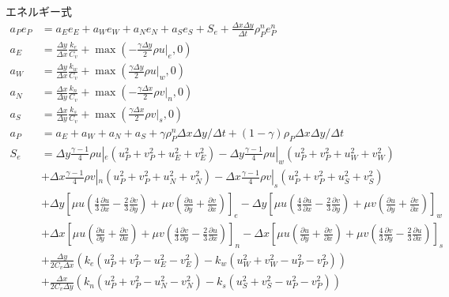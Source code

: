 \documentclass[a4paper,10pt,fleqn,dvipdfmx]{jsarticle}
\begin{document}
エネルギー式
\begin{align}
   a_Pe_P&=a_E e_E + a_W e_W + a_N e_N+a_S e_S +S_e +\frac{\Delta x\Delta
 y}{\Delta t}\rho_P^n e_P^n \\
a_E &= \frac{\Delta y}{\Delta x}\frac{k_e}{C_v} + \max(-\frac{\gamma\Delta
 y}{2} \rho u|_e, 0)\\
a_W &=  \frac{\Delta y}{\Delta x}\frac{k_w}{C_v} + \max(\frac{\gamma\Delta
 y}{2} \rho u|_w, 0)\\
 a_N &= \frac{\Delta x}{\Delta y}\frac{k_n}{C_v} + \max(-\frac{\gamma\Delta
 x}{2} \rho v|_n, 0)\\
 a_S &= \frac{\Delta x}{\Delta y}\frac{k_s}{C_v} + \max(\frac{\gamma\Delta
 x}{2} \rho v|_s, 0) \\
a_P &= a_E +a_W + a_N + a_S + \gamma\rho_P^n \Delta x \Delta y/\Delta t
 +(1-\gamma)\rho_P \Delta x \Delta y/\Delta t\\
S_e &= \Delta y \frac{\gamma-1}{4}\rho u|_e(u_P^2+v_P^2 + u_E^2+v_E^2)
- \Delta y \frac{\gamma-1}{4}\rho u|_w(u_P^2+v_P^2 + u_W^2+v_W^2)
\nonumber \\
& + \Delta x \frac{\gamma-1}{4}\rho v|_n(u_P^2+v_P^2 + u_N^2+v_N^2)
 - \Delta x \frac{\gamma-1}{4}\rho v|_s(u_P^2+v_P^2 + u_S^2+v_S^2)
\nonumber \\
& + \Delta y\left[\mu u \left(\frac{4}{3}\frac{\partial u}{\partial x} -
 \frac{2}{3}\frac{\partial v}{\partial y}\right) + \mu v\left( \frac{\partial u}{\partial y} +
 \frac{\partial v}{\partial x}\right)\right]_e
- \Delta y\left[\mu u \left(\frac{4}{3}\frac{\partial u}{\partial x} -
 \frac{2}{3}\frac{\partial v}{\partial y}\right) + \mu v\left( \frac{\partial u}{\partial y} +
 \frac{\partial v}{\partial x}\right)\right]_w
\nonumber \\
&+ \Delta x\left[\mu u \left(\frac{\partial u}{\partial y} +
 \frac{\partial v}{\partial x}\right) +  \mu v\left(\frac{4}{3}\frac{\partial v}{\partial y} -
 \frac{2}{3}\frac{\partial u}{\partial x}\right)\right]_n
-  \Delta x\left[\mu u \left(\frac{\partial u}{\partial y} +
 \frac{\partial v}{\partial x}\right) +  \mu v\left(\frac{4}{3}\frac{\partial v}{\partial y} -
 \frac{2}{3}\frac{\partial u}{\partial x}\right)\right]_s
\nonumber \\
& + \frac{\Delta y}{2C_v\Delta x}(k_e(u_P^2+v_P^2 - u_E^2 
- v_E^2) -k_w(u_W^2+v_W^2-u_P^2-v_P^2)) 
\nonumber\\
& +\frac{\Delta x}{2C_v\Delta y}(k_n(u_P^2+v_P^2 - u_N^2 
- v_N^2) -k_s(u_S^2+v_S^2-u_P^2-v_P^2)) 
\end{align}
\end{document}
